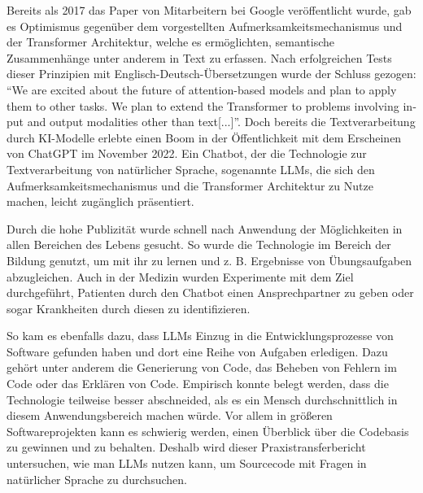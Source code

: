 \documentclass[../main.tex]{subfiles}
\begin{document}
Bereits als 2017 das Paper  von Mitarbeitern bei Google veröffentlicht wurde, gab es Optimismus gegenüber dem vorgestellten Aufmerksamkeitsmechanismus und der Transformer Architektur, welche es ermöglichten, semantische Zusammenhänge unter anderem in Text zu erfassen.
Nach erfolgreichen Tests dieser Prinzipien mit Englisch-Deutsch-Übersetzungen wurde der Schluss gezogen: \foreignquote{english}{We are excited about the future of attention-based models and plan to apply them to other tasks. We plan to extend the Transformer to problems involving input and output modalities other than text[...]}\cite*{vaswani2017attention}.
Doch bereits die Textverarbeitung durch KI-Modelle erlebte einen Boom in der Öffentlichkeit mit dem Erscheinen von ChatGPT im November 2022.
Ein Chatbot, der die Technologie zur Textverarbeitung von natürlicher Sprache, sogenannte \glspl{LLM}, die sich den Aufmerksamkeitsmechanismus und die Transformer Architektur zu Nutze machen, leicht zugänglich präsentiert. \cite{chatgpt2023}

Durch die hohe Publizität wurde schnell nach Anwendung der Möglichkeiten in allen Bereichen des Lebens gesucht.
So wurde die Technologie im Bereich der Bildung genutzt, um mit ihr zu lernen und z. B. Ergebnisse von Übungsaufgaben abzugleichen.
Auch in der Medizin wurden Experimente mit dem Ziel durchgeführt, Patienten durch den Chatbot einen Ansprechpartner zu geben oder sogar Krankheiten durch diesen zu identifizieren.
\cite*{liu2023summary}

So kam es ebenfalls dazu, dass \glspl{LLM} Einzug in die Entwicklungsprozesse von Software gefunden haben und dort eine Reihe von Aufgaben erledigen.
Dazu gehört unter anderem die Generierung von Code, das Beheben von Fehlern im Code oder das Erklären von Code.
Empirisch konnte belegt werden, dass die Technologie teilweise besser abschneided, als es ein Mensch durchschnittlich in diesem Anwendungsbereich machen würde\cite*{tian2023chatgpt}.
Vor allem in größeren Softwareprojekten kann es schwierig werden, einen Überblick über die Codebasis zu gewinnen und zu behalten.
Deshalb wird dieser Praxistransferbericht untersuchen, wie man \glspl{LLM} nutzen kann, um Sourcecode mit Fragen in natürlicher Sprache zu durchsuchen.
\end{document}
